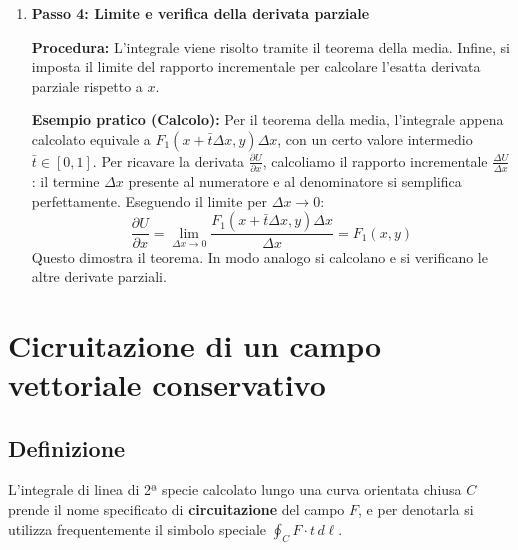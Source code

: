 \begin{enumerate}
    \item \textbf{Passo 4: Limite e verifica della derivata parziale}
    
    \textbf{Procedura:} L'integrale viene risolto tramite il teorema della media. Infine, si imposta il limite del rapporto incrementale per calcolare l'esatta derivata parziale rispetto a $x$.
    
    \textbf{Esempio pratico (Calcolo):} Per il teorema della media, l'integrale appena calcolato equivale a $F_1(x + \bar{t}\Delta x, y)\Delta x$, con un certo valore intermedio $\bar{t} \in [0,1]$. Per ricavare la derivata $\frac{\partial U}{\partial x}$, calcoliamo il rapporto incrementale $\frac{\Delta U}{\Delta x}$: il termine $\Delta x$ presente al numeratore e al denominatore si semplifica perfettamente. Eseguendo il limite per $\Delta x \to 0$:
    \[
    \frac{\partial U}{\partial x} = \lim_{\Delta x \to 0} \frac{F_1(x + \bar{t}\Delta x, y)\Delta x}{\Delta x} = F_1(x,y)
    \]
    Questo dimostra il teorema. In modo analogo si calcolano e si verificano le altre derivate parziali.
\end{enumerate}

\newpage

\section{Cicruitazione di un campo vettoriale conservativo}
\subsection{Definizione}
L'integrale di linea di 2ª specie calcolato lungo una curva orientata chiusa $C$ prende il nome specificato di \textbf{circuitazione} del campo $F$, e per denotarla si utilizza frequentemente il simbolo speciale $\oint_{C} F \cdot t \, d\ell$.

